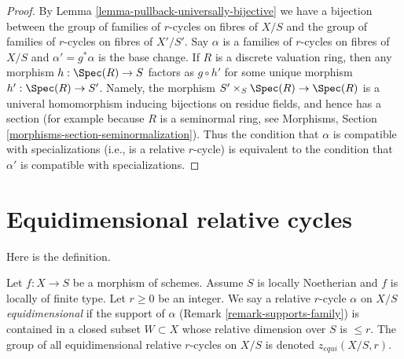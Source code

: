 \begin{proof}
By Lemma \ref{lemma-pullback-universally-bijective} we have a bijection
between the group of families of $r$-cycles on fibres of $X/S$ and
the group of families of $r$-cycles on fibres of $X'/S'$.
Say $\alpha$ is a families of $r$-cycles on fibres of $X/S$ and
$\alpha' = g^*\alpha$ is the base change.
If $R$ is a discrete valuation ring, then any morphism
$h : \Spec(R) \to S$ factors as $g \circ h'$ for some
unique morphism $h' : \Spec(R) \to S'$.
Namely, the morphism $S' \times_S \Spec(R) \to \Spec(R)$ is
a univeral homomorphism inducing bijections on residue fields,
and hence has a section (for example because $R$ is a seminormal
ring, see Morphisms, Section \ref{morphisms-section-seminormalization}).
Thus the condition that $\alpha$ is compatible with
specializations (i.e., is a relative $r$-cycle)
is equivalent to the condition that
$\alpha'$ is compatible with specializations.
\end{proof}






\section{Equidimensional relative cycles}
\label{section-equidimensional}

\noindent
Here is the definition.

\begin{definition}
\label{definition-equidimensional}
Let $f : X \to S$ be a morphism of schemes. Assume $S$ is locally Noetherian
and $f$ is locally of finite type. Let $r \geq 0$ be an integer. We say a
relative $r$-cycle $\alpha$ on $X/S$ {\it equidimensional} if the support
of $\alpha$ (Remark \ref{remark-supports-family})
is contained in a closed subset $W \subset X$ whose relative
dimension over $S$ is $\leq r$.
The group of all equidimensional relative $r$-cycles on $X/S$ is
denoted $z_{equi}(X/S, r)$.
\end{definition}

